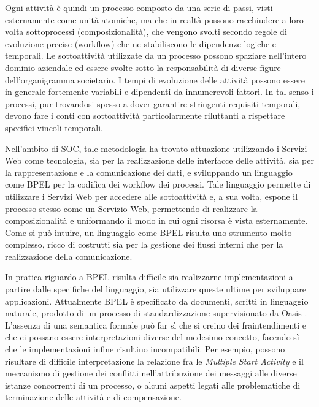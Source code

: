Ogni attività è quindi un processo composto da una serie di passi, visti
esternamente come unità atomiche, ma che in realtà possono racchiudere a loro
volta sottoprocessi (composizionalità), che vengono svolti secondo regole di
evoluzione precise (workflow) che ne stabiliscono le dipendenze logiche e
temporali. Le sottoattività utilizzate da un processo possono spaziare
nell'intero dominio aziendale ed essere svolte sotto la responsabilità di diverse
figure dell'organigramma societario. I tempi di evoluzione delle attività possono
essere in generale fortemente variabili e dipendenti da innumerevoli fattori. In
tal senso i processi, pur trovandosi spesso a dover garantire stringenti
requisiti temporali, devono fare i conti con sottoattività particolarmente riluttanti a
rispettare specifici vincoli temporali.

Nell'ambito di SOC, tale metodologia ha trovato attuazione
utilizzando i Servizi Web come tecnologia, sia per la realizzazione delle interfacce delle
attività, sia per la rappresentazione e la comunicazione dei dati, e
sviluppando un linguaggio come BPEL \cite{BPEL11Spec} per la codifica dei
workflow dei processi. Tale linguaggio permette di utilizzare i Servizi Web per
accedere alle sottoattività e, a sua volta, espone il processo stesso come un Servizio Web,
permettendo di realizzare la composizionalità e uniformando il modo in cui ogni
risorsa è vista esternamente. Come si può intuire, un linguaggio come
BPEL risulta uno strumento molto complesso, ricco di costrutti sia per la gestione
dei flussi interni che per la realizzazione della comunicazione.

In pratica riguardo a BPEL risulta difficile sia realizzarne implementazioni a
partire dalle specifiche del linguaggio, sia utilizzare queste ultime per
sviluppare applicazioni. Attualmente BPEL è specificato da documenti, scritti in
linguaggio naturale, prodotto di un processo di standardizzazione supervisionato
da Oasis \cite{OASISSite}. L'assenza di una semantica formale può far sì che si
creino dei fraintendimenti e che ci possano essere interpretazioni diverse del
medesimo concetto, facendo sì che le implementazioni infine risultino
incompatibili. Per esempio, possono risultare di difficile interpretazione la
relazione fra le \emph{Multiple Start Activity} e il meccanismo di gestione dei
conflitti nell'attribuzione dei messaggi alle diverse istanze concorrenti di
un processo, o alcuni aspetti legati alle problematiche di
terminazione delle attività e di compensazione.

